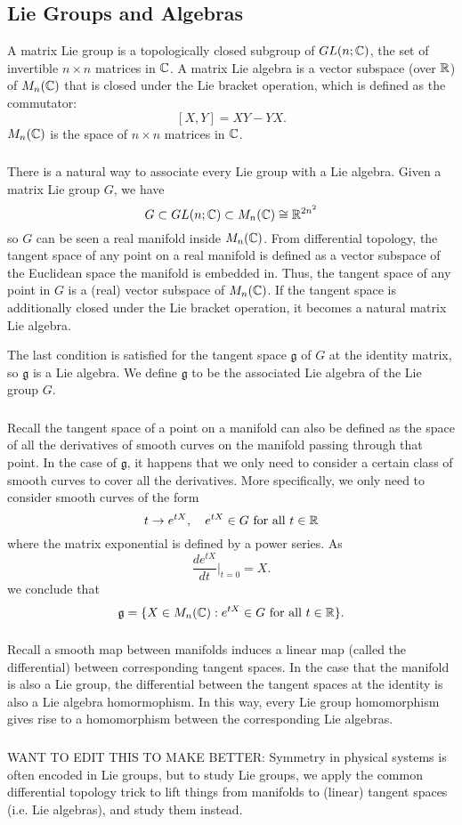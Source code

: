 \subsection{Lie Groups and Algebras}
A matrix Lie group is a topologically closed subgroup of $GL(n; {\mathbb C})$, the set of invertible $n \times n$ matrices in ${\mathbb C}$. A matrix Lie algebra is a vector subspace (over ${\mathbb R}$) of $M_n({\mathbb C})$ that is closed under the Lie bracket operation, which is defined as the commutator:
\[
    [X, Y] = XY - YX.
\]
$M_n({\mathbb C})$ is the space of $n \times n$ matrices in ${\mathbb C}$.

\subsubsection{}
There is a natural way to associate every Lie group with a Lie algebra. Given a matrix Lie group $G$, we have
\[
    G \subset GL(n; {\mathbb C}) \subset M_n({\mathbb C}) \cong {\mathbb R}^{2n^2}
\]
so $G$ can be seen a real manifold inside $M_n({\mathbb C})$. From differential topology, the tangent space of any point on a real manifold is defined as a vector subspace of the Euclidean space the manifold is embedded in. Thus, the tangent space of any point in $G$ is a (real) vector subspace of $M_n({\mathbb C})$. If the tangent space is additionally closed under the Lie bracket operation, it becomes a natural matrix Lie algebra.

The last condition is satisfied for the tangent space $\mathfrak g$ of $G$ at the identity matrix, so $\mathfrak g$ is a Lie algebra. We define $\mathfrak g$ to be the associated Lie algebra of the Lie group $G$.

\subsubsection{}
Recall the tangent space of a point on a manifold can also be defined as the space of all the derivatives of smooth curves on the manifold passing through that point. In the case of $\mathfrak g$, it happens that we only need to consider a certain class of smooth curves to cover all the derivatives. More specifically, we only need to consider smooth curves of the form
\[
    t \rightarrow e^{tX}, \quad e^{tX} \in G \text{ for all } t \in {\mathbb R}
\]
where the matrix exponential is defined by a power series. As
\[
    \frac{d e^{tX}}{dt} \Bigr|_{t = 0} = X.
\]
we conclude that
\[
    \mathfrak g = \{X \in M_n({\mathbb C}) : e^{tX} \in G \text{ for all } t \in {\mathbb R}\}.
\]

\subsubsection{}
Recall a smooth map between manifolds induces a linear map (called the differential) between corresponding tangent spaces. In the case that the manifold is also a Lie group, the differential between the tangent spaces at the identity is also a Lie algebra homormophism. In this way, every Lie group homomorphism gives rise to a homomorphism between the corresponding Lie algebras.


\subsubsection{}
WANT TO EDIT THIS TO MAKE BETTER:
Symmetry in physical systems is often encoded in Lie groups, but to study Lie groups, we apply the common differential topology trick to lift things from manifolds to (linear) tangent spaces (i.e. Lie algebras), and study them instead.

